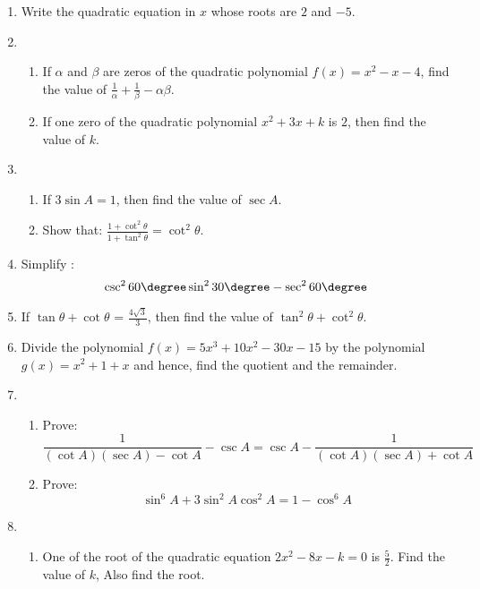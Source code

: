 \begin{enumerate}
	\item Write the quadratic equation in $x$ whose roots are $2$ and $-5$.
	\item 
	\begin{enumerate}
		\item If $\alpha$ and $\beta$ are zeros of the quadratic polynomial $f(x) = x^2 - x - 4$, find the value of $\frac{1}{\alpha} + \frac{1}{\beta} - {\alpha \beta}$.
					
					
			
		\item If one zero of the quadratic polynomial $x^{2} + 3x + k$ is $2$, then find the value of $k$.
	\end{enumerate}
	\item 
	\begin{enumerate}
		\item If $3\sin A = 1$, then find the value of $\sec A$.

					

		\item Show that: $\frac{1 + \cot^2{\theta}}{1 + \tan^2{\theta}} = \cot^2{\theta}$.
	\end{enumerate}
\item Simplify :$${\csc^{2}{60\degree} \sin^{2}{30\degree} - \sec^{2}{60\degree}}$$
	\item If $\tan{\theta} + \cot{\theta}$ = $\frac{4 \sqrt{3}}{3}$, then find the value of $\tan^{2}{\theta} + \cot^{2}{\theta}$. 
	\item Divide the polynomial $f(x) = 5x^{3} + 10x^{2} - 30{x} - 15$ by the polynomial $g(x) = x^{2} + 1 + x$ and hence, find the quotient and the remainder.
	\item
	\begin{enumerate}
		\item Prove:$$\frac{1}{(\cot A)(\sec A) - \cot A} - \csc A = \csc A - \frac{1}{(\cot A)(\sec A) + \cot A}$$

					
		\item Prove:$$\sin^{6} A + 3\sin^{2} A \cos^{2} A = 1 - \cos^{6}  A$$
	\end{enumerate}
	\item
	\begin{enumerate}
		\item One of the root of the quadratic equation $2x^{2} - 8x - k = 0$ is $\frac{5}{2}$. Find the value of $k$, Also find the root.
					

\end{enumerate}
\end{enumerate}
